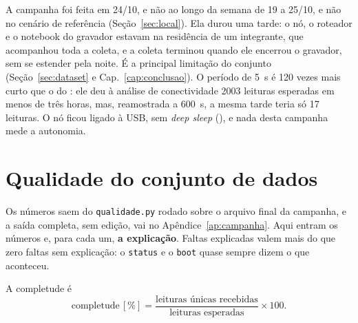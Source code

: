 A campanha foi feita em 24/10, e não ao longo da semana de 19 a 25/10, e
não no cenário de referência (Seção~\ref{sec:local}). Ela durou uma
tarde: o nó, o roteador e o notebook do gravador estavam na residência
de um integrante, que acompanhou toda a coleta, e a coleta terminou
quando ele encerrou o gravador, sem se estender pela noite. É a
principal limitação do conjunto (Seção~\ref{sec:dataset} e
Cap.~\ref{cap:conclusao}). O período de
\SI{5}{\second} é 120 vezes mais curto que o do : ele deu à
análise de conectividade \num{2003} leituras esperadas em menos de três
horas, mas, reamostrada a \SI{600}{\second}, a mesma tarde teria só 17
leituras. O nó ficou ligado à USB, sem \emph{deep sleep} (), e
nada desta campanha mede a autonomia.

\section{Qualidade do conjunto de dados}
\label{sec:qualidade}
\rubricaRobustez

\begin{orientacao}
Os números saem do \texttt{qualidade.py} rodado sobre o arquivo final da
campanha, e a saída completa, sem edição, vai no
Apêndice~\ref{ap:campanha}. Aqui entram os números e, para cada um,
\textbf{a explicação}. Faltas explicadas valem mais do que zero faltas
sem explicação: o \texttt{status} e o \texttt{boot} quase sempre dizem
o que aconteceu.

A completude é
\[
  \text{completude}\,[\%] = \frac{\text{leituras únicas recebidas}}
                                 {\text{leituras esperadas}} \times 100.
\]
\end{orientacao}


